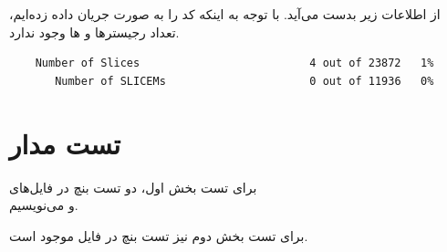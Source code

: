 \documentclass[fleqn]{article}
\begin{document}
از  اطلاعات زیر بدست می‌آید. با توجه به اینکه کد را به صورت 
جریان داده زده‌ایم، تعداد رجیسترها و  ها وجود ندارد.
\begin{latin}
\begin{verbatim}
	Number of Slices                          4 out of 23872   1%
	   Number of SLICEMs                      0 out of 11936   0%
\end{verbatim}
\end{latin}

\section{تست مدار}
برای تست بخش اول، دو تست بنچ در فایل‌های 
\\ و 
 می‌نویسیم.

برای تست بخش دوم نیز تست بنچ در فایل  موجود است.
\end{document}

